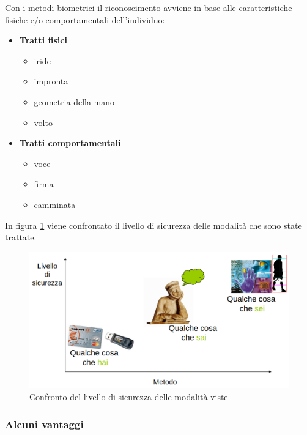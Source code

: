 Con i metodi biometrici il riconoscimento avviene in base alle caratteristiche fisiche e/o comportamentali dell’individuo:
\begin{itemize}
    \item \textbf{Tratti fisici}

    \begin{itemize}
        \item iride
        \item impronta
        \item geometria della mano
        \item volto
    \end{itemize}
    \item \textbf{Tratti comportamentali}

    \begin{itemize}
        \item voce
        \item firma
        \item camminata
    \end{itemize}
\end{itemize}

In figura \ref{fig:trad-vs-bio} viene confrontato il livello di sicurezza delle modalità che sono state trattate.

\begin{figure}
    \centering
    \includegraphics[width=0.75\linewidth]{chapters/images-chap1/tradizionali_vs_biometrici.png}
    \caption{Confronto del livello di sicurezza delle modalità viste}
    \label{fig:trad-vs-bio}
\end{figure}

\subsubsection{Alcuni vantaggi}

